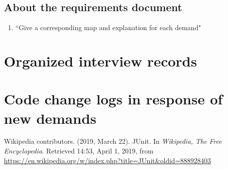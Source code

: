 \documentclass[a4paper]{report}
\begin{document}
\subsection{About the requirements document }
\begin{enumerate}
\item ``Give a corresponding map and explanation for each demand"
\end{enumerate}
\section{Organized interview records}
\section{Code change logs in response of new demands}


\begin{thebibliography}{A}


Wikipedia contributors. (2019, March 22). JUnit. In \emph{Wikipedia, The Free Encyclopedia}. Retrieved 14:53, April 1, 2019, from \url{https://en.wikipedia.org/w/index.php?title=JUnit&oldid=888928403}
\end{thebibliography}
\end{document}
